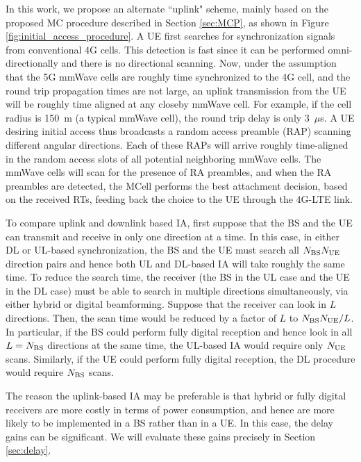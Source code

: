 \documentclass[conference,a4paper]{IEEEtran}
\begin{document}
In this work, we propose an alternate ``uplink"  scheme, mainly based on the proposed MC procedure described in Section \ref{sec:MCP},
as shown in Figure \ref{fig:initial_access_procedure}.  A UE first searches for
synchronization signals from conventional 4G cells.  This detection is fast since it 
can be performed omni-directionally and there is no directional scanning.  
Now, under the assumption that the
5G mmWave cells are roughly time synchronized to the 4G cell, and the round trip propagation times
are not large, an uplink transmission from the UE will be roughly time aligned at any 
closeby mmWave cell.  For example, if the cell radius is 150~m (a typical mmWave cell),
the round trip delay is only 3~$\mu$s.  A UE desiring initial access
thus broadcasts a random access preamble (RAP) scanning different angular directions.
Each of these RAPs will arrive roughly time-aligned in the random access slots of
all potential neighboring mmWave cells.  The mmWave cells will scan for the presence  of RA preambles, and when the RA preambles are detected, the MCell  performs the best attachment decision, based on the received RTs, feeding back the choice to the UE through the 4G-LTE link.

To compare uplink and downlink based IA, first suppose that the BS and the UE
can transmit and receive in only one direction at a time.  In this case, in either
DL or UL-based synchronization, the BS and the UE must search all $N_{\rm BS}N_{\rm UE}$ 
direction pairs and hence both UL and DL-based IA will take roughly the same time.
To reduce the search time, the receiver (the BS in the UL case
and the UE in the DL case) must be able to search in multiple directions simultaneously,
via either hybrid or digital beamforming.  Suppose that the receiver can 
look in $L$ directions.  Then, the scan time would be reduced by a factor
of $L$ to $N_{\rm BS}N_{\rm UE}/L$.  In particular, if the BS could perform fully digital reception
and hence look in all $L=N_{\rm BS}$ directions at the same time, the UL-based IA would require
only $N_{\rm UE}$ scans.  Similarly, if the UE could perform fully digital reception, 
the DL procedure would require $N_{\rm BS}$ scans.  

The reason the uplink-based IA may be preferable is that hybrid or fully digital 
receivers are more costly in terms of power consumption, and hence are more likely to be implemented
in a BS rather than in a UE.  In this case, the delay gains can be significant.
We will evaluate these gains precisely in Section \ref{sec:delay}.
\end{document}
